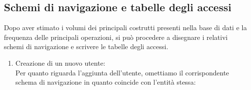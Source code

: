 \documentclass[a4paper,final,12pt]{report}
\begin{document}
\subsection{Schemi di navigazione e tabelle degli accessi}
Dopo aver stimato i volumi dei principali costrutti presenti nella base di dati e la 
frequenza delle principali operazioni, si può procedere a disegnare i relativi schemi 
di navigazione e scrivere le tabelle degli accessi.

\begin{enumerate}
\item Creazione di un nuovo utente:\\
Per quanto riguarda l'aggiunta dell'utente, omettiamo il corrispondente schema di navigazione in quanto coincide con l'entità stessa:

\begin{table}[hbtp]
\centering
{}
\end{table}

\newpage


\end{enumerate}
\end{document}
